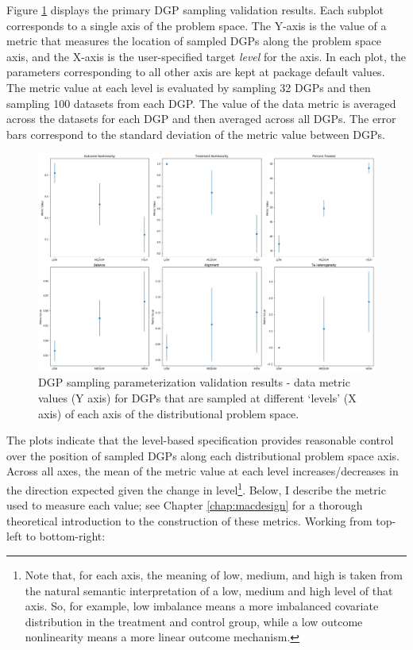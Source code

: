 \documentclass[../main.tex]{subfiles}
\begin{document}
Figure \ref{fig:sampling-validation-results-1} displays the primary DGP sampling validation results. Each subplot corresponds to a single axis of the problem space. The Y-axis is the value of a metric that measures the location of sampled DGPs along the problem space axis, and the X-axis is the user-specified target \textit{level} for the axis. In each plot, the parameters corresponding to all other axis are kept at package default values. The metric value at each level is evaluated by sampling 32 DGPs and then sampling 100 datasets from each DGP. The value of the data metric is averaged across the datasets for each DGP and then averaged across all DGPs. The error bars correspond to the standard deviation of the metric value between DGPs.

\begin{figure}[ht!]
    \centering
    \includegraphics[width=1\linewidth]{figures/ch7-sampling-validation-1.png}
    \caption{DGP sampling parameterization validation results - data metric values (Y axis) for DGPs that are sampled at different `levels' (X axis) of each axis of the distributional problem space.}
    \label{fig:sampling-validation-results-1}
\end{figure}

The plots indicate that the level-based specification provides reasonable control over the position of sampled DGPs along each distributional problem space axis. Across all axes, the mean of the metric value at each level increases/decreases in the direction expected given the change in level\footnote{Note that, for each axis, the meaning of low, medium, and high is taken from the natural semantic interpretation of a low, medium and high level of that axis. So, for example, low imbalance means a more imbalanced covariate distribution in the treatment and control group, while a low outcome nonlinearity means a more linear outcome mechanism.}. Below, I describe the metric used to measure each value; see Chapter \ref{chap:macdesign} for a thorough theoretical introduction to the construction of these metrics. Working from top-left to bottom-right:
\end{document}
